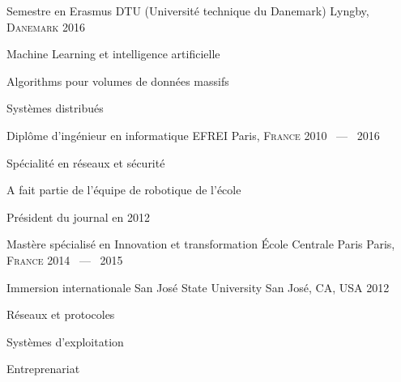 

\begin{cventries}

  \cventry
    {Semestre en Erasmus}
    {DTU (Université technique du Danemark)}
    {Lyngby, \textsc{Danemark} \emojiflagdk}
    {2016}
    {
      \begin{cvitems}
        \item {Machine Learning et intelligence artificielle}
        \item {Algorithms pour volumes de données massifs}
        \item {Systèmes distribués}
      \end{cvitems}
    }

  \cventry
    {Diplôme d'ingénieur en informatique} %
    {EFREI} %
    {Paris, \textsc{France} \emojiflagfr} %
    {2010 ~---~ 2016} %
    {
      \begin{cvitems} %
        \item {Spécialité en réseaux et sécurité}
        \item {A fait partie de l'équipe de robotique de l'école}
        \item {Président du journal en 2012}
      \end{cvitems}
    }

  \cventry
    {Mastère spécialisé en Innovation et transformation}
    {École Centrale Paris}
    {Paris, \textsc{France} \emojiflagfr}
    {2014 ~---~ 2015}
    {
    }

  \cventry
    {Immersion internationale}
    {San José State University}
    {San José, CA, USA \emojiflagus}
    {2012}
    {
      \begin{cvitems}
        \item {Réseaux et protocoles}
        \item {Systèmes d'exploitation}
        \item {Entreprenariat}
      \end{cvitems}
    }

\end{cventries}
